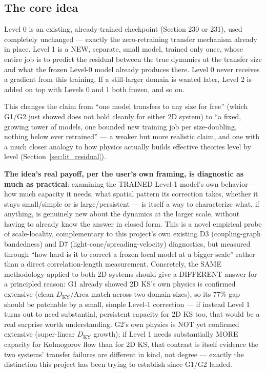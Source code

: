 \documentclass[11pt]{article}
\begin{document}
\subsection{The core idea}

Level 0 is an existing, already-trained checkpoint (Section 230 or 231),
used completely unchanged --- exactly the zero-retraining transfer
mechanism already in place. Level 1 is a NEW, separate, small model,
trained only once, whose entire job is to predict the residual between
the true dynamics at the transfer size and what the frozen Level-0
model already produces there. Level 0 never receives a gradient from
this training. If a still-larger domain is wanted later, Level 2 is
added on top with Levels 0 and 1 both frozen, and so on.

This changes the claim from ``one model transfers to any size for
free'' (which G1/G2 just showed does not hold cleanly for either 2D
system) to ``a fixed, growing tower of models, one bounded new training
job per size-doubling, nothing below ever retrained'' --- a weaker but
more realistic claim, and one with a much closer analogy to how physics
actually builds effective theories level by level (Section~\ref{sec:lit_residual}).

\textbf{The idea's real payoff, per the user's own framing, is diagnostic
as much as practical}: examining the TRAINED Level-1 model's own
behavior --- how much capacity it needs, what spatial pattern its
correction takes, whether it stays small/simple or is large/persistent
--- is itself a way to characterize what, if anything, is genuinely new
about the dynamics at the larger scale, without having to already know
the answer in closed form. This is a novel empirical probe of
scale-locality, complementary to this project's own existing D3
(coupling-graph bandedness) and D7 (light-cone/spreading-velocity)
diagnostics, but measured through ``how hard is it to correct a frozen
local model at a bigger scale'' rather than a direct correlation-length
measurement. Concretely, the SAME methodology applied to both 2D systems
should give a DIFFERENT answer for a principled reason: G1 already
showed 2D KS's own physics is confirmed extensive (clean
$D_{\mathrm{KY}}/\mathrm{Area}$ match across two domain sizes), so its
77\% gap should be patchable by a small, simple Level-1 correction ---
if instead Level 1 turns out to need substantial, persistent capacity
for 2D KS too, that would be a real surprise worth understanding. G2's
own physics is NOT yet confirmed extensive (super-linear
$D_{\mathrm{KY}}$ growth); if Level 1 needs substantially MORE capacity
for Kolmogorov flow than for 2D KS, that contrast is itself evidence the
two systems' transfer failures are different in kind, not degree ---
exactly the distinction this project has been trying to establish since
G1/G2 landed.
\end{document}
